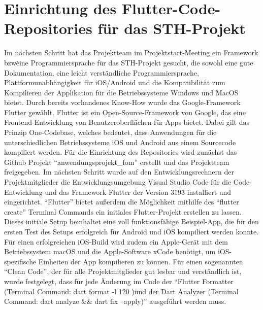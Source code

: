 \section*{Einrichtung des Flutter-Code-Repositories für das STH-Projekt}
Im nächsten Schritt hat das Projektteam im Projektstart-Meeting ein Framework bzw\. eine Programmiersprache für das STH-Projekt gesucht, die sowohl eine gute Dokumentation, eine leicht verständliche Programmiersprache, Plattformunabhängigkeit für iOS/Android und die Kompatibilität zum Kompilieren der Applikation für die Betriebssysteme Windows und MacOS bietet.
Durch bereits vorhandenes Know-How wurde das Google-Framework Flutter gewählt.\newline
Flutter ist ein Open-Source-Framework von Google, das eine Frontend-Entwicklung von Benutzeroberflächen für Apps bietet.
Dabei gilt das Prinzip One-Codebase, welches bedeutet, dass Anwendungen für die unterschiedlichen Betriebssysteme iOS und Android aus einem Sourcecode kompiliert werden.
\newline
Für die Einrichtung des Repositories wird zunächst das Github Projekt ``anwendungsprojekt\_fom'' erstellt und das Projektteam freigegeben.
Im nächsten Schritt wurde auf den Entwicklungsrechnern der Projektmitglieder die Entwicklungsumgebung Visual Studio Code für die Code-Entwicklung und das Framework Flutter der Version 3\.19\.3 installiert und eingerichtet.
``Flutter'' bietet außerdem die Möglichkeit mithilfe des ``flutter create'' Terminal Commands ein initiales Flutter-Projekt erstellen zu lassen.
Dieses initiale Setup beinhaltet eine voll funktionsfähige Beispiel-App, die für den ersten Test des Setups erfolgreich für Android und iOS kompiliert werden konnte.
Für einen erfolgreichen iOS-Build wird zudem ein Apple-Gerät mit dem Betriebssystem macOS und die Apple-Software xCode benötigt, um iOS-spezifische Einheiten der App kompilieren zu können.
\newline
Für einen sogenannten ``Clean Code'', der für alle Projektmitglieder gut lesbar und verständlich ist, wurde festgelegt, dass für jede Änderung im Code der ``Flutter Formatter (Terminal Command: dart format -l 120 \.)\" und der Dart Analyzer (Terminal Command: dart analyze \&\& dart fix --apply)'' ausgeführt werden muss.
